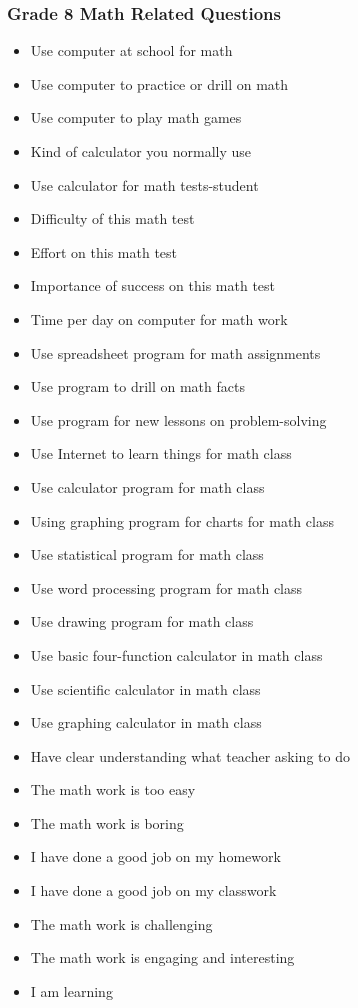 \documentclass[letterpaper,12p,twoside]{article} %
\begin{document}
\begin{singlespace}
\subsubsection{Grade 8 Math Related Questions}
\begin{itemize}
	\item Use computer at school for math
	\item Use computer to practice or drill on math
	\item Use computer to play math games
	\item Kind of calculator you normally use
	\item Use calculator for math tests-student
	\item Difficulty of this math test
	\item Effort on this math test
	\item Importance of success on this math test
	\item Time per day on computer for math work
	\item Use spreadsheet program for math assignments
	\item Use program to drill on math facts
	\item Use program for new lessons on problem-solving
	\item Use Internet to learn things for math class
	\item Use calculator program for math class
	\item Using graphing program for charts for math class
	\item Use statistical program for math class
	\item Use word processing program for math class
	\item Use drawing program for math class
	\item Use basic four-function calculator in math class
	\item Use scientific calculator in math class
	\item Use graphing calculator in math class
	\item Have clear understanding what teacher asking to do
	\item The math work is too easy
	\item The math work is boring
	\item I have done a good job on my homework
	\item I have done a good job on my classwork
	\item The math work is challenging
	\item The math work is engaging and interesting
	\item I am learning
\end{itemize}


\end{singlespace}
\end{document}
